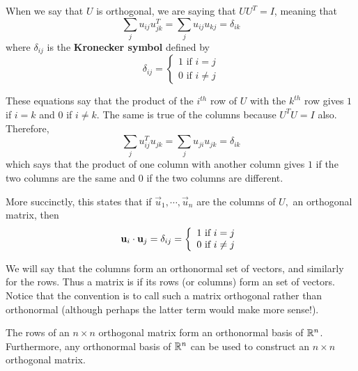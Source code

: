 \documentclass{ximera}
\begin{document}
When we say that $U$ is orthogonal, we are saying that $UU^T=I$, meaning that
\begin{equation*}
\sum_{j}u_{ij}u_{jk}^{T}=\sum_{j}u_{ij}u_{kj}=\delta _{ik}
\end{equation*}
where $\delta _{ij}$ is the \textbf{Kronecker symbol}
defined
 by
\begin{equation*}
\delta _{ij}=\left\{
\begin{array}{c}
1
\text{ if }i=j \\
0\text{ if }i\neq j
\end{array}
\right.
\end{equation*}

These equations say that the product of the $i^{th}$ row of $U$ with the $k^{th}$ row
gives $1$ if $i=k$ and $0$ if $i\neq k.$ The same is true of the columns because
$U^{T}U=I$ also. Therefore,
\begin{equation*}
\sum_{j}u_{ij}^{T}u_{jk}=\sum_{j}u_{ji}u_{jk}=\delta _{ik}
\end{equation*}
which says that the product of one column with another column gives $1$ if the two
columns are the same and $0$ if the two columns are different.

More succinctly, this states that if $\vec{u}_{1},\cdots ,\vec{u}_{n}$
are the columns of $U,$ an orthogonal matrix, then
\[
\mathbf{u}_{i}\cdot \mathbf{u}_{j}=\delta _{ij} = \left\{
\begin{array}{c}
1\text{ if }i=j \\
0\text{ if }i\neq j
\end{array}
\right.
\]

We will say that the columns form an orthonormal set of vectors, and similarly for the rows. Thus a matrix is  if its rows (or columns) form an
 set of vectors. Notice that the convention is to call such a matrix orthogonal rather than orthonormal (although perhaps the latter term would make more sense!).

\begin{theorem}\label{orthbasis}
The rows of an $n \times n$ orthogonal matrix form an orthonormal
basis of $\mathbb{R}^n$. Furthermore, any orthonormal basis of
$\mathbb{R}^n$ can be used to construct an $n \times n$ orthogonal
matrix.
\end{theorem}
\end{document}
